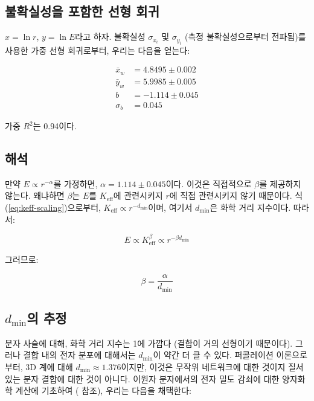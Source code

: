 \documentclass[12pt,a4paper]{article}
\newcommand{\Keff}{K_{\mathrm{eff}}}
\begin{document}
	\subsection{불확실성을 포함한 선형 회귀}
	
	$x = \ln r$, $y = \ln E$라고 하자. 불확실성 $\sigma_{x_i}$ 및 $\sigma_{y_i}$ (측정 불확실성으로부터 전파됨)를 사용한 가중 선형 회귀로부터, 우리는 다음을 얻는다:
	
	\begin{align}
		\bar{x}_w &= 4.8495 \pm 0.002 \\
		\bar{y}_w &= 5.9985 \pm 0.005 \\
		b &= -1.114 \pm 0.045 \\
		\sigma_b &= 0.045
	\end{align}
	
	가중 $R^2$는 0.94이다.
	
	\subsection{해석}
	
	만약 $E \propto r^{-\alpha}$를 가정하면, $\alpha = 1.114 \pm 0.045$이다. 이것은 직접적으로 $\beta$를 제공하지 않는다. 왜냐하면 $\beta$는 $E$를 $\Keff$에 관련시키지 $r$에 직접 관련시키지 않기 때문이다. 식 (\ref{eq:keff-scaling})으로부터, $\Keff \propto r^{-d_{\text{min}}}$이며, 여기서 $d_{\text{min}}$은 화학 거리 지수이다. 따라서:
	
	\begin{equation}
		E \propto \Keff^{\beta} \propto r^{-\beta d_{\text{min}}}
		\label{eq:E-r-beta}
	\end{equation}
	
	그러므로:
	
	\begin{equation}
		\beta = \frac{\alpha}{d_{\text{min}}}
		\label{eq:beta-from-alpha}
	\end{equation}
	
	\subsection{$d_{\text{min}}$의 추정}
	
	분자 사슬에 대해, 화학 거리 지수는 1에 가깝다 (결합이 거의 선형이기 때문이다). 그러나 결합 내의 전자 분포에 대해서는 $d_{\text{min}}$이 약간 더 클 수 있다. 퍼콜레이션 이론으로부터, 3D 계에 대해 $d_{\text{min}} \approx 1.376$이지만, 이것은 무작위 네트워크에 대한 것이지 질서 있는 분자 결합에 대한 것이 아니다. 이원자 분자에서의 전자 밀도 감쇠에 대한 양자화학 계산에 기초하여 (\cite{Bader1990} 참조), 우리는 다음을 채택한다:
	
\end{document}

